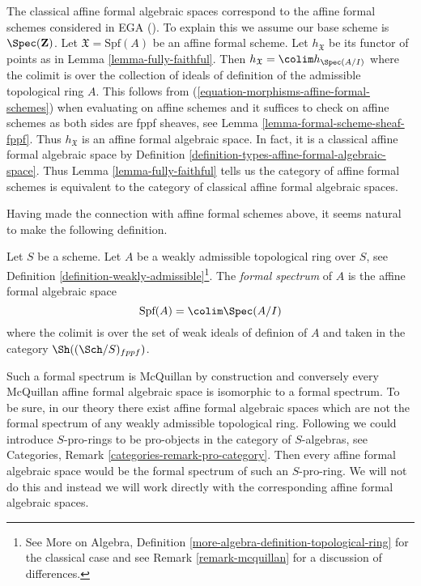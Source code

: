 \begin{remark}
\label{remark-compare-with-affine-formal-schemes}
The classical affine formal algebraic spaces correspond to the
affine formal schemes considered in EGA (\cite{EGA}). To explain this
we assume our base scheme is $\Spec(\mathbf{Z})$. Let
$\mathfrak X = \text{Spf}(A)$ be an affine formal scheme.
Let $h_\mathfrak X$ be its functor of points as in
Lemma \ref{lemma-fully-faithful}.
Then $h_\mathfrak X = \colim h_{\Spec(A/I)}$ where the colimit
is over the collection of ideals of definition of the admissible
topological ring $A$. This follows from
(\ref{equation-morphisms-affine-formal-schemes})
when evaluating on affine schemes and it suffices to check
on affine schemes as both sides are fppf sheaves, see
Lemma \ref{lemma-formal-scheme-sheaf-fppf}.
Thus $h_\mathfrak X$ is an affine formal algebraic space.
In fact, it is a classical affine formal algebraic space
by Definition \ref{definition-types-affine-formal-algebraic-space}.
Thus Lemma \ref{lemma-fully-faithful} tells us
the category of affine formal schemes is equivalent to the category
of classical affine formal algebraic spaces.
\end{remark}

\noindent
Having made the connection with affine formal schemes above,
it seems natural to make the following definition.

\begin{definition}
\label{definition-affine-formal-spectrum}
Let $S$ be a scheme. Let $A$ be a weakly admissible topological ring over
$S$, see Definition \ref{definition-weakly-admissible}\footnote{See
More on Algebra, Definition
\ref{more-algebra-definition-topological-ring}
for the classical case and see Remark \ref{remark-mcquillan}
for a discussion of differences.}.
The {\it formal spectrum} of $A$ is the affine formal algebraic space
$$
\text{Spf}(A) = \colim \Spec(A/I)
$$
where the colimit is over the set of weak ideals of definion of $A$
and taken in the category $\Sh((\Sch/S)_{fppf})$.
\end{definition}

\noindent
Such a formal spectrum is McQuillan by construction and conversely
every McQuillan affine formal algebraic space is isomorphic to a
formal spectrum. To be sure, in our theory there exist affine formal
algebraic spaces which are not the formal spectrum of any
weakly admissible topological ring.
Following \cite{Yasuda} we could introduce $S$-pro-rings
to be pro-objects in the category of $S$-algebras, see Categories,
Remark \ref{categories-remark-pro-category}. Then every
affine formal algebraic space would be the formal spectrum of such
an $S$-pro-ring. We will not do this and instead we will work directly with the
corresponding affine formal algebraic spaces.

